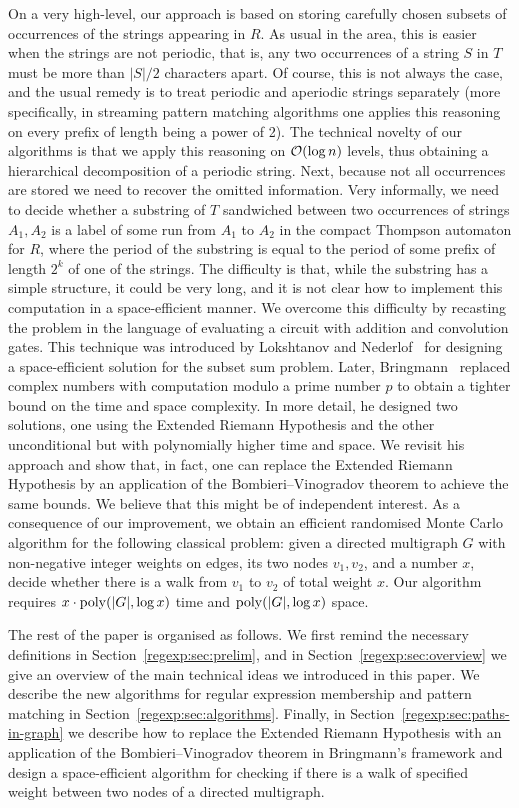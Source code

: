 On a very high-level, our approach is based on storing carefully chosen subsets of occurrences of the strings appearing in $R$.
As usual in the area, this is easier when the strings are not periodic, that is, any two occurrences of a string $S$ in $T$ must
be more than $|S|/2$ characters apart. Of course, this is not always the case, and the usual remedy is to treat periodic
and aperiodic strings separately (more specifically, in streaming pattern matching algorithms one applies this reasoning
on every prefix of length being a power of 2).
The technical novelty of our algorithms is that we apply this reasoning on $\mathcal{O}(\log n)$ levels, thus obtaining
a hierarchical decomposition of a periodic string.
Next, because not all occurrences are stored we need to recover the omitted information.
Very informally, we need to decide whether a substring of $T$ sandwiched between two occurrences of strings $A_1,A_2$ is a label of some run from $A_1$ to $A_2$ in the compact Thompson automaton for $R$, where the period of the substring is equal to the period of
some prefix of length $2^{k}$ of one of the strings. The difficulty is that, while the substring has a simple structure, it could be
very long, and it is not clear how to implement this computation in a space-efficient manner.
We overcome this difficulty by recasting the problem in the language of evaluating a circuit with addition
and convolution gates. This technique was introduced by Lokshtanov and Nederlof~\cite{LokshtanovN10} for designing
a space-efficient solution for the subset sum problem. Later, Bringmann~\cite{Bringmann17} replaced
complex numbers with computation modulo a prime number $p$ to obtain a tighter bound on the time and space complexity.
In more detail, he designed two solutions, one using the Extended Riemann Hypothesis and the other unconditional but
with polynomially higher time and space.
We revisit his approach and show that, in fact, one can replace the Extended Riemann Hypothesis by an application
of the Bombieri--Vinogradov theorem to achieve the same bounds. We believe that this might be of independent interest.
As a consequence of our improvement, we obtain an efficient randomised Monte Carlo algorithm for the following classical problem: given a directed multigraph $G$ with non-negative integer weights on edges, its two nodes $v_1,v_2$, and a number $x$, decide whether there is a walk from $v_1$ to $v_2$ of total weight $x$. Our algorithm requires $x\cdot\mathrm{poly}(|G|,\log x)$ time and $\mathrm{poly}(|G|,\log x)$ space.

The rest of the paper is organised as follows. We first remind the necessary definitions in Section~\ref{regexp:sec:prelim}, and in Section~\ref{regexp:sec:overview} we give an overview of the main technical ideas we introduced in this paper. We describe the new algorithms for regular expression membership and pattern matching in Section~\ref{regexp:sec:algorithms}. Finally, in Section~\ref{regexp:sec:paths-in-graph} we describe how to
replace the Extended Riemann Hypothesis with an application of the Bombieri--Vinogradov theorem
in Bringmann's framework and design a space-efficient algorithm for checking if there is a walk of specified weight between
two nodes of a directed multigraph.
